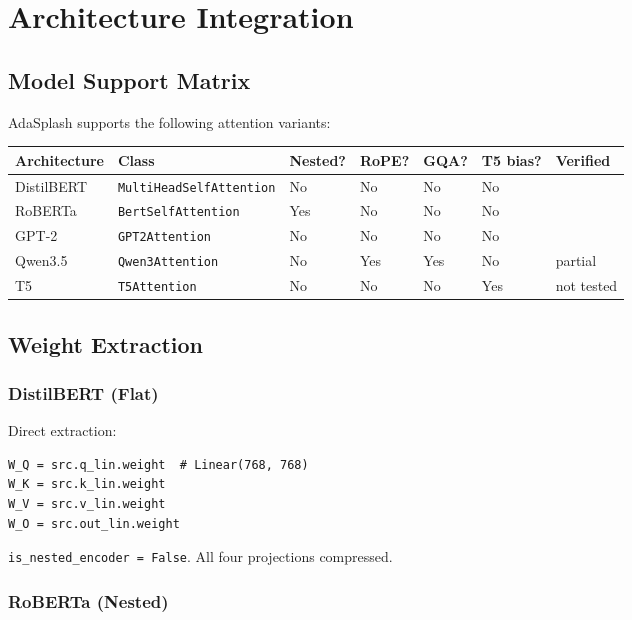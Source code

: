 
\section{Architecture Integration}

\subsection{Model Support Matrix}

AdaSplash supports the following attention variants:

\begin{table}[H]
\centering
\small
\begin{tabular}{lllllll}
\toprule
\textbf{Architecture} & \textbf{Class} & \textbf{Nested?} & \textbf{RoPE?} & \textbf{GQA?} & \textbf{T5 bias?} & \textbf{Verified} \\
\midrule
DistilBERT & \texttt{MultiHeadSelfAttention} & No & No & No & No &  \\
RoBERTa & \texttt{BertSelfAttention} & Yes & No & No & No &  \\
GPT-2 & \texttt{GPT2Attention} & No & No & No & No &  \\
Qwen3.5 & \texttt{Qwen3Attention} & No & Yes & Yes & No & partial \\
T5 & \texttt{T5Attention} & No & No & No & Yes & not tested \\
\bottomrule
\end{tabular}
\end{table}

\subsection{Weight Extraction}

\subsubsection{DistilBERT (Flat)}

Direct extraction:

\begin{lstlisting}
W_Q = src.q_lin.weight  # Linear(768, 768)
W_K = src.k_lin.weight
W_V = src.v_lin.weight
W_O = src.out_lin.weight
\end{lstlisting}

\texttt{is\_nested\_encoder = False}. All four projections compressed.

\subsubsection{RoBERTa (Nested)}

